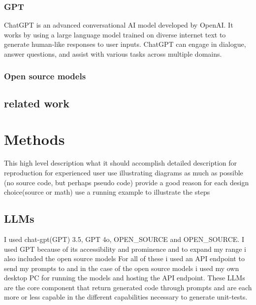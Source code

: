 \documentclass[a4paper,11pt,oneside]{memoir}
\begin{document}
\subsection{GPT}
ChatGPT is an advanced conversational AI model developed by OpenAI. It works by using a large language model trained on diverse internet text to generate human-like responses to user inputs. ChatGPT can engage in dialogue, answer questions, and assist with various tasks across multiple domains.
\subsection{Open source models}
\section{related work}

\chapter{Methods}
This 
high level description
what it should accomplish
detailed description for reproduction for experienced user
use illustrating diagrams as much as possible
(no source code, but perhaps pseudo code)
provide a good reason for each design choice(source or math)
use a running example to illustrate the steps
\section{LLMs}
I used chat-gpt(GPT) 3.5, GPT 4o, OPEN_SOURCE and OPEN_SOURCE. 
I used GPT because of its accessibility and prominence and to expand my range i also included the open source models
For all of these i used an API endpoint to send my prompts to and in the case of the open source models i used my own desktop PC for running the models and hosting the API endpoint.
These LLMs are the core component that return generated code through prompts and are each more or less capable in the different capabilities necessary to generate unit-tests. 
\end{document}
